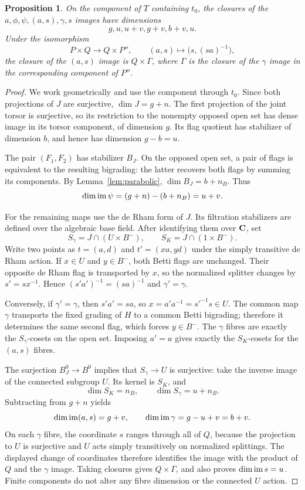 \documentclass[11pt]{article}
\newtheorem{proposition}[theorem]{Proposition}
\theoremstyle{definition}\newtheorem{definition}[theorem]{Definition}
\theoremstyle{remark}\newtheorem{remark}[theorem]{Remark}
\begin{document}
\begin{proposition}\label{prop:images}
On the component of $T$ containing $t_0$, the closures of the $a,\phi,\psi,(a,s),\gamma,s$ images have dimensions
\[
                      g, u, u+v, g+v, b+v, u.
\]
Under the isomorphism
\[
 P\times Q\longrightarrow Q\times P'',\qquad
 (a,s)\longmapsto\bigl(s,(sa)^{-1}\bigr),
\]
the closure of the $(a,s)$ image is $Q\times\Gamma$, where $\Gamma$ is the closure of the $\gamma$ image in the corresponding component of $P''$.
\end{proposition}
\begin{proof}
We work geometrically and use the component through $t_0$. Since both projections of $J$ are surjective, $\dim J=g+n$. The first projection of the joint torsor is surjective, so its restriction to the nonempty opposed open set has dense image in its torsor component, of dimension $g$. Its flag quotient has stabilizer of dimension $b$, and hence has dimension $g-b=u$.

The pair $(F_1,F_2)$ has stabilizer $B_J$. On the opposed open set, a pair of flags is equivalent to the resulting bigrading: the latter recovers both flags by summing its components. By Lemma~\ref{lem:parabolic}, $\dim B_J=b+n_B$. Thus
\[
            \dim\operatorname{im}\psi=(g+n)-(b+n_B)=u+v.
\]

For the remaining maps use the de Rham form of $J$. Its filtration stabilizers are defined over the algebraic base field. After identifying them over $\mathbf C$, set
\[
 S_\gamma=J\cap(U\times B^-),\qquad
 S_K=J\cap(1\times B^-).
\]
Write two points as $t=(a,d)$ and $t'=(xa,yd)$ under the simply transitive de Rham action. If $x\in U$ and $y\in B^-$, both Betti flags are unchanged. Their opposite de Rham flag is transported by $x$, so the normalized splitter changes by $s'=sx^{-1}$. Hence $(s'a')^{-1}=(sa)^{-1}$ and $\gamma' =\gamma$.

Conversely, if $\gamma'=\gamma$, then $s'a'=sa$, so $x=a'a^{-1}=s'^{-1}s\in U$. The common map $\gamma$ transports the fixed grading of $H$ to a common Betti bigrading; therefore it determines the same second flag, which forces $y\in B^-$. The $\gamma$ fibres are exactly the $S_\gamma$-cosets on the open set. Imposing $a'=a$ gives exactly the $S_K$-cosets for the $(a,s)$ fibres.

The surjection $B_J^0\to B^0$ implies that $S_\gamma\to U$ is surjective: take the inverse image of the connected subgroup $U$. Its kernel is $S_K$, and
\[
          \dim S_K=n_B,\qquad \dim S_\gamma=u+n_B.
\]
Subtracting from $g+n$ yields
\[
 \dim\operatorname{im}(a,s)=g+v,\qquad
 \dim\operatorname{im}\gamma=g-u+v=b+v.
\]
On each $\gamma$ fibre, the coordinate $s$ ranges through all of $Q$, because the projection to $U$ is surjective and $U$ acts simply transitively on normalized splittings. The displayed change of coordinates therefore identifies the image with the product of $Q$ and the $\gamma$ image. Taking closures gives $Q\times\Gamma$, and also proves $\dim\operatorname{im} s=u$. Finite components do not alter any fibre dimension or the connected $U$ action.
\end{proof}
\end{document}
